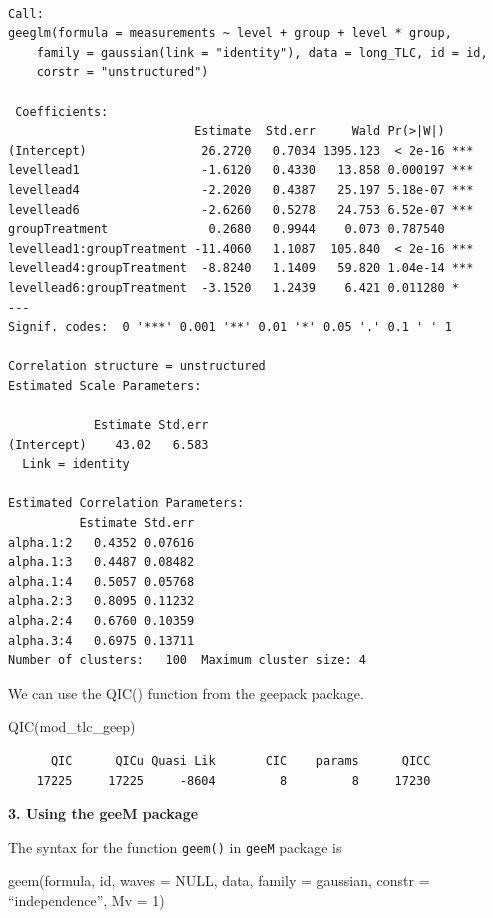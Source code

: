 \documentclass[
  letterpaper,
  DIV=11,
  numbers=noendperiod]{scrreprt}
\newenvironment{Shaded}{\begin{snugshade}}{\end{snugshade}}
\newcommand{\FunctionTok}[1]{\textcolor[rgb]{0.28,0.35,0.67}{#1}}
\newcommand{\NormalTok}[1]{\textcolor[rgb]{0.00,0.23,0.31}{#1}}
\begin{document}
\begin{verbatim}

Call:
geeglm(formula = measurements ~ level + group + level * group, 
    family = gaussian(link = "identity"), data = long_TLC, id = id, 
    corstr = "unstructured")

 Coefficients:
                          Estimate  Std.err     Wald Pr(>|W|)    
(Intercept)                26.2720   0.7034 1395.123  < 2e-16 ***
levellead1                 -1.6120   0.4330   13.858 0.000197 ***
levellead4                 -2.2020   0.4387   25.197 5.18e-07 ***
levellead6                 -2.6260   0.5278   24.753 6.52e-07 ***
groupTreatment              0.2680   0.9944    0.073 0.787540    
levellead1:groupTreatment -11.4060   1.1087  105.840  < 2e-16 ***
levellead4:groupTreatment  -8.8240   1.1409   59.820 1.04e-14 ***
levellead6:groupTreatment  -3.1520   1.2439    6.421 0.011280 *  
---
Signif. codes:  0 '***' 0.001 '**' 0.01 '*' 0.05 '.' 0.1 ' ' 1

Correlation structure = unstructured 
Estimated Scale Parameters:

            Estimate Std.err
(Intercept)    43.02   6.583
  Link = identity 

Estimated Correlation Parameters:
          Estimate Std.err
alpha.1:2   0.4352 0.07616
alpha.1:3   0.4487 0.08482
alpha.1:4   0.5057 0.05768
alpha.2:3   0.8095 0.11232
alpha.2:4   0.6760 0.10359
alpha.3:4   0.6975 0.13711
Number of clusters:   100  Maximum cluster size: 4 
\end{verbatim}

We can use the QIC() function from the geepack package.

\begin{Shaded}
\begin{Highlighting}[]
\FunctionTok{QIC}\NormalTok{(mod\_tlc\_geep)}
\end{Highlighting}
\end{Shaded}

\begin{verbatim}
      QIC      QICu Quasi Lik       CIC    params      QICC 
    17225     17225     -8604         8         8     17230 
\end{verbatim}

\textbf{3. Using the geeM package}

The syntax for the function \texttt{geem()} in \texttt{geeM} package is

geem(formula, id, waves = NULL, data, family = gaussian, constr =
``independence'', Mv = 1)
\end{document}
